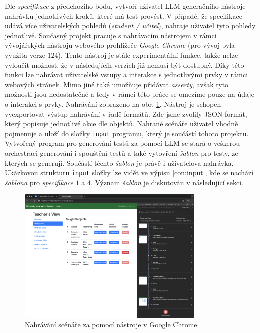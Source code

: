 \documentclass[czech, ma, kiv, he, iso690alph, pdf, viewonly]{fasthesis}
\begin{document}
    Dle \emph{specifikace} z předchozího bodu, vytvoří uživatel LLM generačního nástroje nahrávku jednotlivých kroků, které má test provést. V případě, že specifikace udává více uživatelských pohledů (\textit{student / učitel}), nahraje uživatel tyto pohledy jednotlivě. Současný projekt pracuje s nahrávacím nástrojem v rámci vývojářských nástrojů webového prohlížeče \textit{Google Chrome} (pro vývoj byla využita verze \(124\)). Tento nástroj je stále experimentální funkce, takže nelze vyloučit možnost, že v následujícíh verzích již nemusí být dostupný. Díky této funkci lze nahrávat uživatelské vstupy a interakce s jednotlivými prvky v rámci webových stránek. Mimo jiné také umožňuje přidávat \textit{asserty}, avšak tyto možnosti jsou nedostatečné a tedy v rámci této práce se omezíme pouze na údaje o interakci s prvky. Nahrávání zobrazeno na obr. \ref{fig:chrome_recording}. Nástroj je schopen vyexportovat výstup nahrávání v řadě formátů. Zde jsme zvolily JSON formát, který popisuje jednotlivé akce dle objektů. Nahrané scénáře uživatel vhodně pojmenuje a uloží do složky \verb|input| programu, který je součástí tohoto projektu. Vytvořený program pro generování testů za pomocí LLM se stará o veškerou orchestraci generování i spouštění testů a také vytovření \emph{šablon} pro testy, ze kterých se generují. Součástí těchto \emph{šablon} je právě i uživatelova nahrávka. Ukázkovou strukturu \verb|input| složky lze vidět ve výpisu \ref{con:input}, kde se nachází \emph{šablona} pro \textit{specifikace} \(1\) a \(4\). Význam \emph{šablon} je diskutován v následující sekci.

    \begin{figure}
        \includegraphics[width=0.8\textwidth]{pic/recording.png}
        \centering
        \caption{Nahrávání scénáře za pomocí nástroje v Google Chrome}
        \label{fig:chrome_recording}
    \end{figure}
\end{document}
